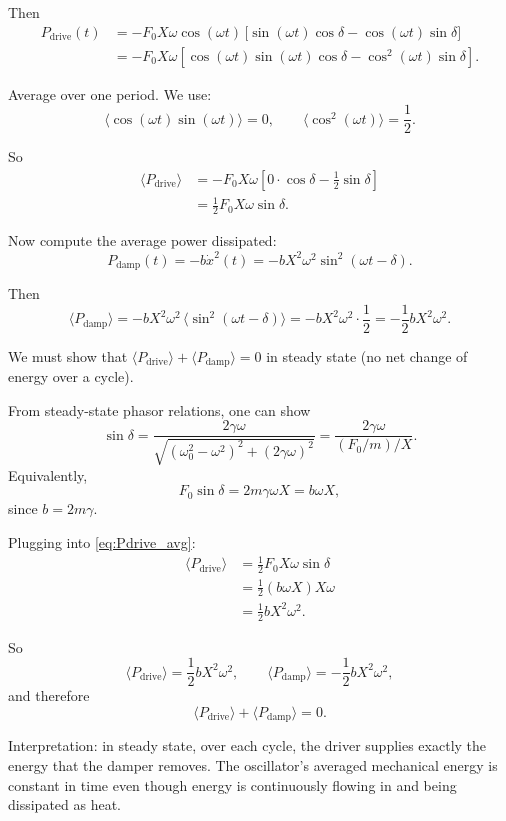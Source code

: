 \documentclass[12pt]{article}
\begin{document}
\begin{enumerate}
Then
\begin{align}
P_\text{drive}(t)
&= -F_0 X \omega \cos(\omega t)\,
\big[ \sin(\omega t)\cos\delta - \cos(\omega t)\sin\delta \big] \\
&= -F_0 X \omega
\left[
\cos(\omega t)\sin(\omega t)\cos\delta
- \cos^2(\omega t)\sin\delta
\right].
\end{align}

Average over one period. We use:
\[
\langle \cos(\omega t)\sin(\omega t) \rangle = 0,
\qquad
\langle \cos^2(\omega t) \rangle = \frac{1}{2}.
\]

So
\begin{align}
\langle P_\text{drive} \rangle
&= -F_0 X \omega
\left[
0 \cdot \cos\delta
- \frac{1}{2}\sin\delta
\right] \\
&= \frac{1}{2} F_0 X \omega \sin\delta.
\label{eq:Pdrive_avg}
\end{align}

Now compute the average power dissipated:
\[
P_\text{damp}(t) = - b \dot{x}^2(t)
= - b X^2 \omega^2 \sin^2(\omega t - \delta).
\]

Then
\[
\langle P_\text{damp} \rangle
= - b X^2 \omega^2 \, \langle \sin^2(\omega t - \delta) \rangle
= - b X^2 \omega^2 \cdot \frac{1}{2}
= -\frac{1}{2} b X^2 \omega^2.
\label{eq:Pdamp_avg_prelim}
\]

We must show that $\langle P_\text{drive} \rangle + \langle P_\text{damp} \rangle = 0$ in steady state (no net change of energy over a cycle).

From steady-state phasor relations, one can show
\[
\sin\delta = \frac{2\gamma \omega}{\sqrt{(\omega_0^2 - \omega^2)^2 + (2 \gamma \omega)^2}}
= \frac{2\gamma \omega}{(F_0/m)/X}.
\]
Equivalently,
\[
F_0 \sin\delta
= 2 m \gamma \omega X
= b \omega X,
\]
since $b = 2 m \gamma$.

Plugging into \eqref{eq:Pdrive_avg}:
\begin{align}
\langle P_\text{drive} \rangle
&= \frac{1}{2} F_0 X \omega \sin\delta \\
&= \frac{1}{2} (b \omega X) X \omega \\
&= \frac{1}{2} b X^2 \omega^2.
\end{align}

So
\[
\boxed{
\langle P_\text{drive} \rangle
= \frac{1}{2} b X^2 \omega^2,
\qquad
\langle P_\text{damp} \rangle
= -\frac{1}{2} b X^2 \omega^2,
}
\]
and therefore
\[
\langle P_\text{drive} \rangle + \langle P_\text{damp} \rangle = 0.
\]

Interpretation: in steady state, over each cycle, the driver supplies exactly the energy that the damper removes. The oscillator's averaged mechanical energy is constant in time even though energy is continuously flowing in and being dissipated as heat.



\end{enumerate}
\end{document}
